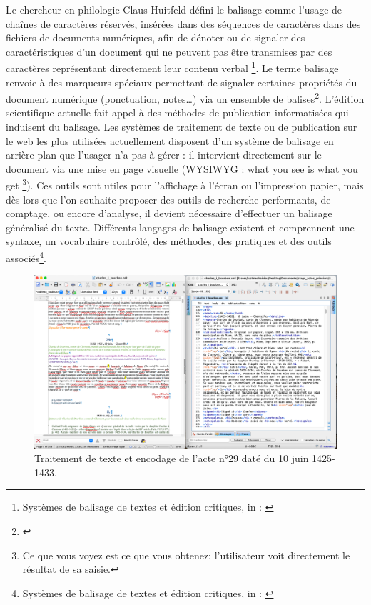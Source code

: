 \par Le chercheur en philologie Claus Huitfeld défini le balisage comme \og l'usage de chaînes de caractères réservés, insérées dans des séquences de caractères dans des fichiers de documents numériques, afin de dénoter ou de signaler des caractéristiques d'un document qui ne peuvent pas être transmises par des caractères représentant directement leur contenu verbal \fg \footnote{\og Systèmes de balisage de textes et édition critiques\fg, in : \cite{apollonEditionCritiqueEre2017}}. Le terme balisage renvoie à des marqueurs spéciaux permettant de signaler certaines propriétés du document numérique (ponctuation, notes…) via un ensemble de balises\footnote{\cite{apollonEditionCritiqueEre2017}}. L’édition scientifique actuelle fait appel à des méthodes de publication informatisées qui induisent du balisage. Les systèmes de traitement de texte ou de publication sur le web les plus utilisées actuellement disposent d’un système de balisage en \og arrière-plan \fg \space que l'usager n'a pas à gérer : il intervient directement sur le document via une mise en page visuelle (WYSIWYG : \og what you see is what you get \fg\footnote{\og Ce que vous voyez est ce que vous obtenez\fg : l'utilisateur voit directement le résultat de sa saisie.}). Ces outils sont utiles pour l'affichage à l'écran ou l'impression papier, mais dès lors que l'on souhaite proposer des outils de recherche performants, de comptage, ou encore d'analyse, il devient nécessaire d'effectuer un balisage généralisé du texte. Différents langages de balisage existent et comprennent une syntaxe, un vocabulaire contrôlé, des méthodes, des pratiques et des outils associés\footnote{\og Systèmes de balisage de textes et édition critiques\fg, in : \cite{apollonEditionCritiqueEre2017}}. 
\newline 

\begin{figure}[ht]
    \centering
    \includegraphics[scale=0.3]{img/odt_vs_xml.png}
    \caption{Traitement de texte et encodage de l'acte n°29 daté du 10 juin 1425-1433.}
    \label{fig:odt_vs_xml}
\end{figure}
\newpage 

